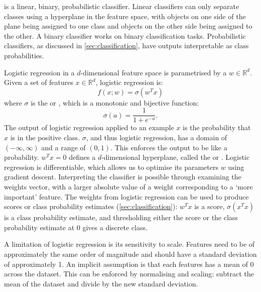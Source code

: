          is a linear, binary, probabilistic classifier. Linear classifiers can only separate classes using a hyperplane in the feature space, with objects on one side of the plane being assigned to one class and objects on the other side being assigned to the other. A binary classifier works on binary classification tasks. Probabilistic classifiers, as discussed in \autoref{sec:classification}, have outputs interpretable as class probabilities.

        Logistic regression in a $d$-dimensional feature space is parametrised by a  $w \in \mathbb R^d$. Given a set of features $x \in \mathbb R^d$, logistic regression is:
        \begin{equation}
            \label{eq:logistic-regression}
            f(x; w) = \sigma(w^T x)
        \end{equation}
        where $\sigma$ is the  or , which is a monotonic and bijective function:
        \begin{equation}
            \label{eq:logistic-function}
            \sigma(a) = \frac{1}{1 + e^{-a}}.
        \end{equation}
        The output of logistic regression applied to an example $x$ is the probability that $x$ is in the positive class. $\sigma$, and thus logistic regression, has a domain of $(-\infty, \infty)$ and a range of $(0, 1)$. This enforces the output to be like a probability. $w^T x= 0$ defines a $d$-dimensional hyperplane, called the  or . Logistic regression is differentiable, which allows us to optimise its parameters $w$ using gradient descent. Interpreting the classifier is possible through examining the weights vector, with a larger absolute value of a weight corresponding to a `more important' feature. The weights from logistic regression can be used to produce scores or class probability estimates (\autoref{sec:classification}): $w^T x$ is a score, $\sigma(x^T x)$ is a class probability estimate, and thresholding either the score or the class probability estimate at $0$ gives a discrete class.

        A limitation of logistic regression is its sensitivity to scale. Features need to be of approximately the same order of magnitude and should have a standard deviation of approximately 1. An implicit assumption is that each features has a mean of 0 across the dataset. This can be enforced by normalising and scaling: subtract the mean of the dataset and divide by the new standard deviation.

